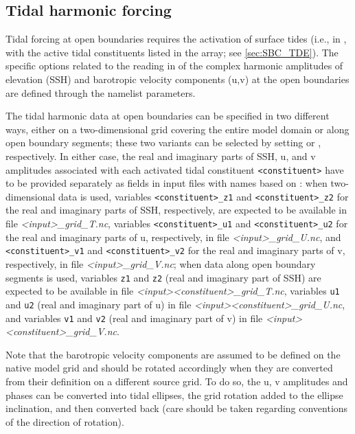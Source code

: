 \documentclass[../main/NEMO_manual]{subfiles}
\begin{document}
\subsection{Tidal harmonic forcing}
\label{subsec:LBC_bdy_tides}

\begin{listing}
  \caption{}
  \label{lst:nambdy_tide}
\end{listing}

Tidal forcing at open boundaries requires the activation of surface
tides (i.e., in ,  with the active tidal
constituents listed in the  array; see
\autoref{sec:SBC_TDE}). The specific options related to the reading in of
the complex harmonic amplitudes of elevation (SSH) and barotropic
velocity components (u,v) at the open boundaries are defined through the
 namelist parameters.\par

The tidal harmonic data at open boundaries can be specified in two
different ways, either on a two-dimensional grid covering the entire
model domain or along open boundary segments; these two variants can
be selected by setting  or
, respectively. In either
case, the real and imaginary parts of SSH, u, and v amplitudes associated with
each activated tidal constituent \texttt{<constituent>} have to be provided
separately as fields in input files with names based on
: when two-dimensional data is used, variables
\texttt{<constituent>\_z1} and \texttt{<constituent>\_z2} for the real and imaginary parts of
SSH, respectively, are expected to be available in file
\textit{<input>\_grid\_T.nc}, variables \texttt{<constituent>\_u1} and
\texttt{<constituent>\_u2} for the real and imaginary parts of u, respectively, in file
\textit{<input>\_grid\_U.nc}, and \texttt{<constituent>\_v1} and
\texttt{<constituent>\_v2} for the real and imaginary parts of v, respectively, in file
\textit{<input>\_grid\_V.nc}; when data along open boundary segments is used,
variables \texttt{z1} and \texttt{z2} (real and imaginary part of SSH) are
expected to be available in file \textit{<input><constituent>\_grid\_T.nc},
variables \texttt{u1} and \texttt{u2} (real and imaginary part of u) in file
\textit{<input><constituent>\_grid\_U.nc}, and variables \texttt{v1} and \texttt{v2}
(real and imaginary part of v) in file
\textit{<input><constituent>\_grid\_V.nc}.\par

Note that the barotropic velocity components are assumed to be defined
on the native model grid and should be rotated accordingly when they
are converted from their definition on a different source grid. To do
so, the u, v amplitudes and phases can be converted into tidal
ellipses, the grid rotation added to the ellipse inclination, and then
converted back (care should be taken regarding conventions of the
direction of rotation). %

\subinc{}
\end{document}
